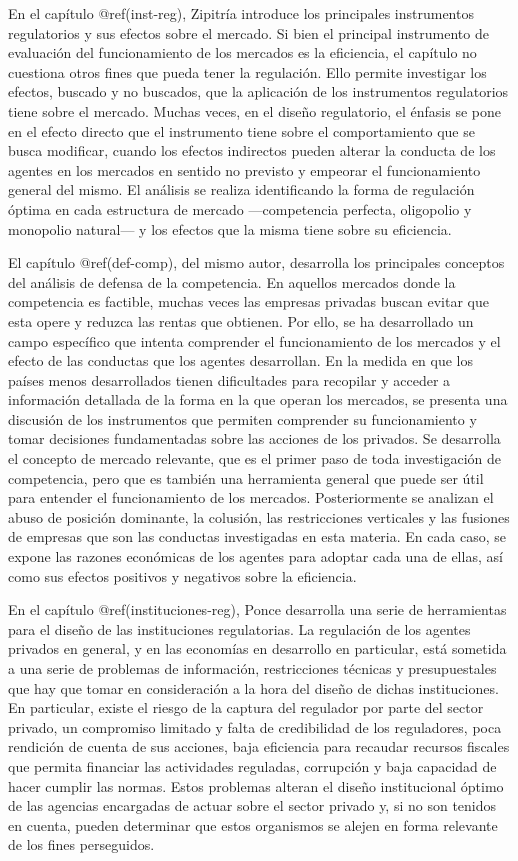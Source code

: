 \documentclass[
  12pt,
  spanish,
]{book}
\begin{document}
En el capítulo @ref(inst-reg), Zipitría introduce los principales
instrumentos regulatorios y sus efectos sobre el mercado. Si bien el
principal instrumento de evaluación del funcionamiento de los mercados
es la eficiencia, el capítulo no cuestiona otros fines que pueda tener
la regulación. Ello permite investigar los efectos, buscado y no
buscados, que la aplicación de los instrumentos regulatorios tiene sobre
el mercado. Muchas veces, en el diseño regulatorio, el énfasis se pone
en el efecto directo que el instrumento tiene sobre el comportamiento
que se busca modificar, cuando los efectos indirectos pueden alterar la
conducta de los agentes en los mercados en sentido no previsto y
empeorar el funcionamiento general del mismo. El análisis se realiza
identificando la forma de regulación óptima en cada estructura de
mercado ---competencia perfecta, oligopolio y monopolio natural--- y los
efectos que la misma tiene sobre su eficiencia.

El capítulo @ref(def-comp), del mismo autor, desarrolla los principales
conceptos del análisis de defensa de la competencia. En aquellos
mercados donde la competencia es factible, muchas veces las empresas
privadas buscan evitar que esta opere y reduzca las rentas que obtienen.
Por ello, se ha desarrollado un campo específico que intenta comprender
el funcionamiento de los mercados y el efecto de las conductas que los
agentes desarrollan. En la medida en que los países menos desarrollados
tienen dificultades para recopilar y acceder a información detallada de
la forma en la que operan los mercados, se presenta una discusión de los
instrumentos que permiten comprender su funcionamiento y tomar
decisiones fundamentadas sobre las acciones de los privados. Se
desarrolla el concepto de mercado relevante, que es el primer paso de
toda investigación de competencia, pero que es también una herramienta
general que puede ser útil para entender el funcionamiento de los
mercados. Posteriormente se analizan el abuso de posición dominante, la
colusión, las restricciones verticales y las fusiones de empresas que
son las conductas investigadas en esta materia. En cada caso, se expone
las razones económicas de los agentes para adoptar cada una de ellas,
así como sus efectos positivos y negativos sobre la eficiencia.

En el capítulo @ref(instituciones-reg), Ponce desarrolla una serie de
herramientas para el diseño de las instituciones regulatorias. La
regulación de los agentes privados en general, y en las economías en
desarrollo en particular, está sometida a una serie de problemas de
información, restricciones técnicas y presupuestales que hay que tomar
en consideración a la hora del diseño de dichas instituciones. En
particular, existe el riesgo de la captura del regulador por parte del
sector privado, un compromiso limitado y falta de credibilidad de los
reguladores, poca rendición de cuenta de sus acciones, baja eficiencia
para recaudar recursos fiscales que permita financiar las actividades
reguladas, corrupción y baja capacidad de hacer cumplir las normas.
Estos problemas alteran el diseño institucional óptimo de las agencias
encargadas de actuar sobre el sector privado y, si no son tenidos en
cuenta, pueden determinar que estos organismos se alejen en forma
relevante de los fines perseguidos.
\end{document}
